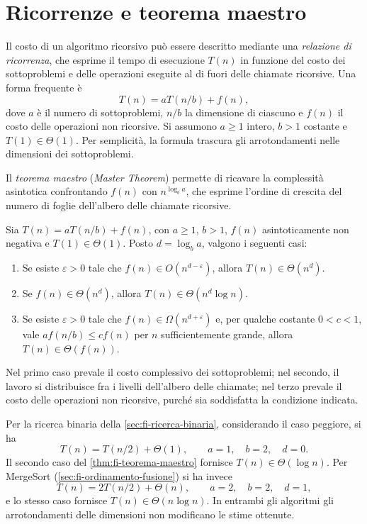\clearpage

\section{Ricorrenze e teorema maestro}
\label{sec:fi-teorema-maestro}

Il costo di un algoritmo ricorsivo può essere descritto mediante una
\emph{relazione di ricorrenza}, che esprime il tempo di esecuzione
\(T(n)\) in funzione del costo dei sottoproblemi e delle operazioni
eseguite al di fuori delle chiamate ricorsive. Una forma frequente è
\[
  T(n)=aT(n/b)+f(n),
\]
dove \(a\) è il numero di sottoproblemi, \(n/b\) la dimensione di
ciascuno e \(f(n)\) il costo delle operazioni non ricorsive.
Si assumono \(a\ge1\) intero, \(b>1\) costante e \(T(1)\in\Theta(1)\).
Per semplicità, la formula trascura gli arrotondamenti nelle dimensioni
dei sottoproblemi.

Il \emph{teorema maestro} (\emph{Master Theorem}) permette di
ricavare la complessità asintotica confrontando \(f(n)\) con
\(n^{\log_b a}\), che esprime l'ordine di crescita del numero
di foglie dell'albero delle chiamate ricorsive.

\begin{theorem}
\label{thm:fi-teorema-maestro}
Sia \(T(n)=aT(n/b)+f(n)\), con \(a\ge1\), \(b>1\),
\(f(n)\) asintoticamente non negativa e \(T(1)\in\Theta(1)\).
Posto \(d=\log_b a\), valgono i seguenti casi:
\begin{enumerate}
  \item Se esiste \(\varepsilon>0\) tale che
  \(f(n)\in O(n^{d-\varepsilon})\), allora
  \(T(n)\in\Theta(n^d)\).
  \item Se \(f(n)\in\Theta(n^d)\), allora
  \(T(n)\in\Theta(n^d\log n)\).
  \item Se esiste \(\varepsilon>0\) tale che
  \(f(n)\in\Omega(n^{d+\varepsilon})\) e, per qualche costante
  \(0<c<1\), vale \(af(n/b)\le cf(n)\) per \(n\) sufficientemente
  grande, allora \(T(n)\in\Theta(f(n))\).
\end{enumerate}
\end{theorem}

Nel primo caso prevale il costo complessivo dei sottoproblemi;
nel secondo, il lavoro si distribuisce fra i livelli dell'albero
delle chiamate; nel terzo prevale il costo delle operazioni non
ricorsive, purché sia soddisfatta la condizione indicata.

Per la ricerca binaria della \cref{sec:fi-ricerca-binaria},
considerando il caso peggiore, si ha
\[
  T(n)=T(n/2)+\Theta(1),
  \qquad a=1,\quad b=2,\quad d=0.
\]
Il secondo caso del \cref{thm:fi-teorema-maestro} fornisce
\(T(n)\in\Theta(\log n)\). Per MergeSort
(\cref{sec:fi-ordinamento-fusione}) si ha invece
\[
  T(n)=2T(n/2)+\Theta(n),
  \qquad a=2,\quad b=2,\quad d=1,
\]
e lo stesso caso fornisce \(T(n)\in\Theta(n\log n)\).
In entrambi gli algoritmi gli arrotondamenti delle dimensioni
non modificano le stime ottenute.

